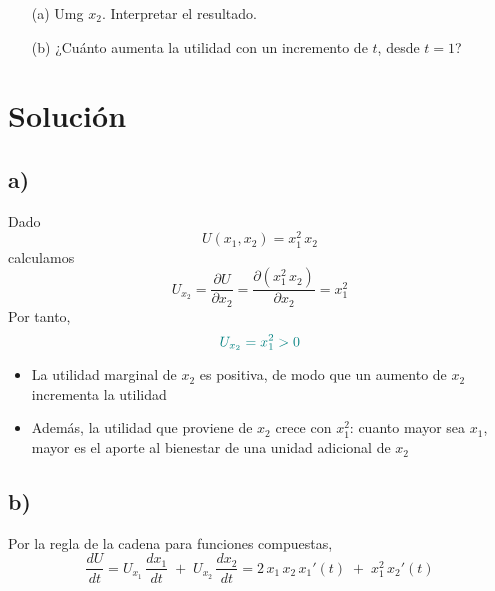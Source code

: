 \documentclass{article}
\begin{document}
\begin{itemize}
\item[(a)] Umg \(x_2\). Interpretar el resultado.
\item[(b)] ¿Cuánto aumenta la utilidad con un incremento de $t$, desde $t=1$?
\end{itemize}
\newpage
\section*{Solución}
\subsection*{a)}

Dado 
\[
U(x_1,x_2)=x_1^2\,x_2
\]
calculamos
\[
U_{x_2}
=\frac{\partial U}{\partial x_2}
=\frac{\partial (x_1^2\,x_2)}{\partial x_2}
= x_1^2
\]
Por tanto,
\[ \color{teal}
U_{x_2} = x_1^2 > 0
\]
\begin{itemize}
  \item La utilidad marginal de \(x_2\) es positiva, de modo que un aumento de \(x_2\) incrementa la utilidad
  \item Además, la utilidad que proviene de \(x_2\) crece con \(x_1^2\): cuanto mayor sea \(x_1\), mayor es el aporte al bienestar de una unidad adicional de \(x_2\)
\end{itemize}

\subsection*{b)}

Por la regla de la cadena para funciones compuestas,
\[
\frac{dU}{dt}
= U_{x_1}\,\frac{dx_1}{dt} \;+\; U_{x_2}\,\frac{dx_2}{dt}
= 2\,x_1\,x_2\,x_1'(t)\;+\;x_1^2\,x_2'(t)
\]
\end{document}
